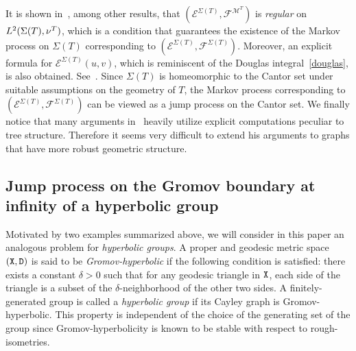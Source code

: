 \documentclass[10pt]{amsart}
\theoremstyle{definition}\newtheorem{defi}[theo]{Definition}\newtheorem{rema}[theo]{Remark}\newtheorem{exam}[theo]{Example}\newtheorem{exem}[theo]{Example}\newtheorem{nota}[theo]{Notation}
\newcommand{\ce}{\mathcal{E}}
\newcommand{\cf}{\mathcal{F}}
\newcommand{\cm}{\mathcal{M}}
\begin{document}
It is shown in~\cite{Ki}, among other results, that $(\ce^{\Sigma(T)}, \cf^{\cm^T})$ is \emph{regular} on $L^2(\Sigma(T),\linebreak \nu^{T})$, which is a condition that guarantees the existence of the Markov process on $\Sigma(T)$ corresponding to $(\ce^{\Sigma(T)}, \cf^{\Sigma(T)})$. Moreover, an explicit formula for $\ce^{\Sigma(T)}(u,v)$, which is reminiscent of the Douglas integral~\eqref{douglas}, is also obtained. See~\cite[Theorem~5.6]{Ki}. Since $\Sigma(T)$ is homeomorphic to the Cantor set under suitable assumptions on the geometry of $T$, the Markov process corresponding to $(\ce^{\Sigma(T)}, \cf^{\Sigma(T)})$ can be viewed as a jump process on the Cantor set. We finally notice that many arguments in~\cite{Ki} heavily utilize explicit computations peculiar to tree structure. Therefore it seems very difficult to extend his arguments to graphs that have more robust geometric structure.



\subsection*{Jump process on the Gromov boundary at infinity of a hyperbolic group}
Motivated by two examples summarized above, we will consider in this paper an analogous problem for \emph{hyperbolic groups}. A proper and geodesic metric space $(\tt{X}, \tt{D})$ is said to be \emph{Gromov-hyperbolic} if the following condition is satisfied: there exists a constant $\delta>0$ such that for any geodesic triangle in ${\tt X}$, each side of the triangle is a subset of the $\delta$-neighborhood of the other two sides. A finitely-generated group is called a \emph{hyperbolic group} if its Cayley graph is Gromov-hyperbolic. This property is independent of the choice of the generating set of the group since Gromov-hyperbolicity is known to be stable with respect to rough-isometries.
\end{document}
